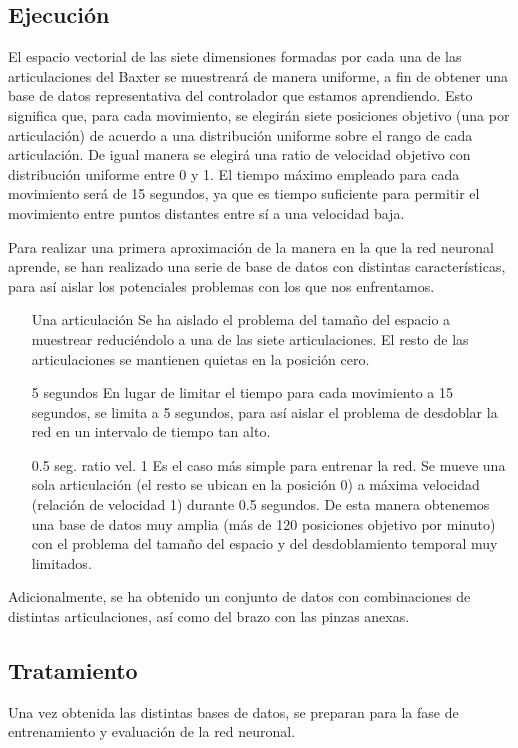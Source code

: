 \subsection{Ejecución}
El espacio vectorial de las siete dimensiones formadas por cada una de las articulaciones del Baxter se muestreará de manera uniforme, a fin de obtener una base de datos representativa del controlador que estamos aprendiendo. Esto significa que, para cada movimiento, se elegirán siete posiciones objetivo (una por articulación) de acuerdo a una distribución uniforme sobre el rango de cada articulación. De igual manera se elegirá una ratio de velocidad objetivo con distribución uniforme entre 0 y 1. El tiempo máximo empleado para cada movimiento será de 15 segundos, ya que es tiempo suficiente para permitir el movimiento entre puntos distantes entre sí a una velocidad baja.

Para realizar una primera aproximación de la manera en la que la red neuronal aprende, se han realizado una serie de base de datos con distintas características, para así aislar los potenciales problemas con los que nos enfrentamos.

\begin{itemize}
\item [Una articulación] Se ha aislado el problema del tamaño del espacio a muestrear reduciéndolo a una de las siete articulaciones. El resto de las articulaciones se mantienen quietas en la posición cero.
\item [5 segundos] En lugar de limitar el tiempo para cada movimiento a 15 segundos, se limita a 5 segundos, para así aislar el problema de desdoblar la red en un intervalo de tiempo tan alto.
\item [0.5 seg. ratio vel. 1] Es el caso más simple para entrenar la red. Se mueve una sola articulación (el resto se ubican en la posición 0) a máxima velocidad (relación de velocidad 1) durante 0.5 segundos. De esta manera obtenemos una base de datos muy amplia (más de 120 posiciones objetivo por minuto) con el problema del tamaño del espacio y del desdoblamiento temporal muy limitados.
\end{itemize}

Adicionalmente, se ha obtenido un conjunto de datos con combinaciones de distintas articulaciones, así como del brazo con las pinzas anexas.

\subsection{Tratamiento}
Una vez obtenida las distintas bases de datos, se preparan para la fase de entrenamiento y evaluación de la red neuronal.


